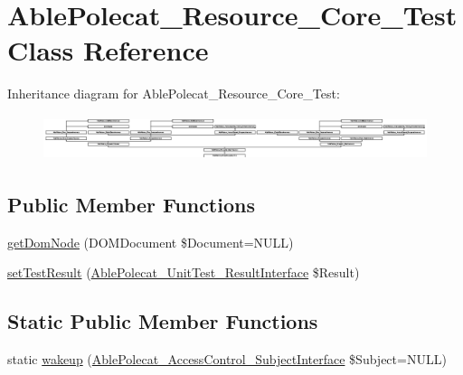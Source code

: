 \hypertarget{class_able_polecat___resource___core___test}{}\section{Able\+Polecat\+\_\+\+Resource\+\_\+\+Core\+\_\+\+Test Class Reference}
\label{class_able_polecat___resource___core___test}
Inheritance diagram for Able\+Polecat\+\_\+\+Resource\+\_\+\+Core\+\_\+\+Test\+:\begin{figure}[H]
\begin{center}
\leavevmode
\includegraphics[height=1.327913cm]{class_able_polecat___resource___core___test}
\end{center}
\end{figure}
\subsection*{Public Member Functions}
\begin{DoxyCompactItemize}
\item 
\hyperlink{class_able_polecat___resource___core___test_a3241c66cb1cbb7b720be191808876012}{get\+Dom\+Node} (D\+O\+M\+Document \$Document=N\+U\+L\+L)
\item 
\hyperlink{class_able_polecat___resource___core___test_a3ff459f3e84f1bd6f9a800acf24dc98f}{set\+Test\+Result} (\hyperlink{interface_able_polecat___unit_test___result_interface}{Able\+Polecat\+\_\+\+Unit\+Test\+\_\+\+Result\+Interface} \$Result)
\end{DoxyCompactItemize}
\subsection*{Static Public Member Functions}
\begin{DoxyCompactItemize}
\item 
static \hyperlink{class_able_polecat___resource___core___test_a3f2135f6ad45f51d075657f6d20db2cd}{wakeup} (\hyperlink{interface_able_polecat___access_control___subject_interface}{Able\+Polecat\+\_\+\+Access\+Control\+\_\+\+Subject\+Interface} \$Subject=N\+U\+L\+L)
\end{DoxyCompactItemize}
